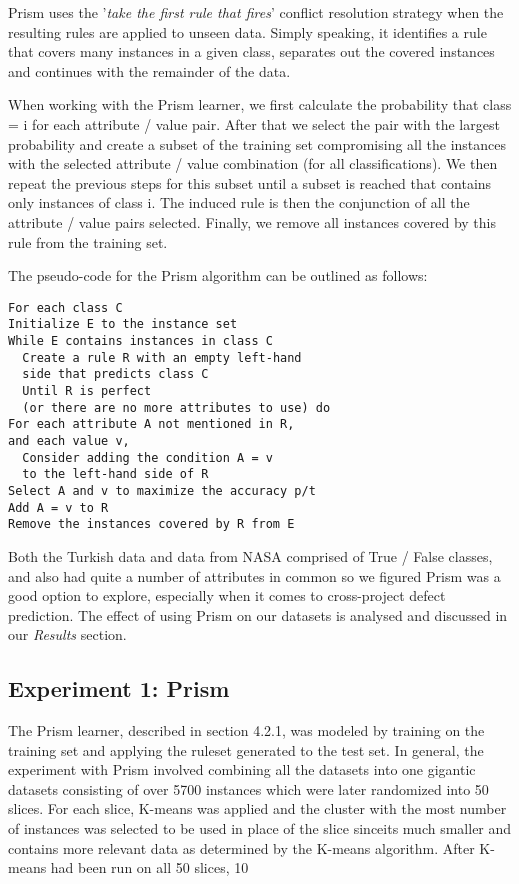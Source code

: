 \documentclass{sig-alternate}
\begin{document}
Prism uses the '{\em take the first rule that fires}' conflict resolution strategy when the resulting rules are applied to unseen data. Simply speaking, it identifies a rule that covers many instances in a given class, separates out the covered instances and continues with the remainder of the data.

When working with the Prism learner, we first calculate the probability that class = i for each attribute / value pair. After that we select the pair with the largest probability and create a subset of the training set compromising all the instances with the selected attribute / value combination (for all classifications). We then repeat the previous steps for this subset until a subset is reached that contains only instances of class i. The induced rule is then the conjunction of all the attribute / value pairs selected. Finally, we remove all instances covered by this rule from the training set.


The pseudo-code for the Prism algorithm can be outlined as follows:
\begin{verbatim}
For each class C
Initialize E to the instance set
While E contains instances in class C
  Create a rule R with an empty left-hand
  side that predicts class C
  Until R is perfect 
  (or there are no more attributes to use) do
For each attribute A not mentioned in R, 
and each value v,
  Consider adding the condition A = v 
  to the left-hand side of R
Select A and v to maximize the accuracy p/t
Add A = v to R
Remove the instances covered by R from E
\end{verbatim}
Both the Turkish data and data from NASA comprised of True / False classes, and also had quite a number of attributes in common so we figured Prism was a good option to explore, especially when it comes to cross-project defect prediction. The effect of using Prism on our datasets is analysed and discussed in our {\em Results} section.


\subsection{Experiment 1: Prism}

The Prism learner, described in section 4.2.1, was modeled by training on the training set and applying the ruleset generated to the test set. In general, the experiment with Prism involved combining all the datasets into one gigantic datasets consisting of over 5700 instances which were later randomized into 50 slices. For each slice, K-means was applied and the cluster with the most number of instances was selected to be used in place of the slice sinceits much smaller and contains more relevant data as determined by the K-means algorithm. After K-means had been run on all 50 slices, 10%
\end{document}
